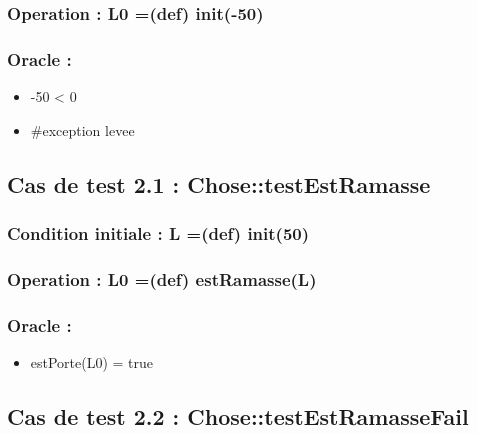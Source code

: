 \documentclass[11pt]{article}
\begin{document}
\subsubsection{Operation : L0 =(def) init(-50)}
\label{sec-1.2.2}

\subsubsection{Oracle :}
\label{sec-1.2.3}

\begin{itemize}

\item -50 < 0\\
\label{sec-1.2.3.1}


\item \#exception levee\\
\label{sec-1.2.3.2}





\end{itemize} %
\subsection{Cas de test 2.1 : Chose::testEstRamasse}
\label{sec-1.3}

\subsubsection{Condition initiale : L =(def) init(50)}
\label{sec-1.3.1}

\subsubsection{Operation : L0 =(def) estRamasse(L)}
\label{sec-1.3.2}

\subsubsection{Oracle :}
\label{sec-1.3.3}

\begin{itemize}

\item estPorte(L0) = true\\
\label{sec-1.3.3.1}


\end{itemize} %
\subsection{Cas de test 2.2 : Chose::testEstRamasseFail}
\label{sec-1.4}
\end{document}
